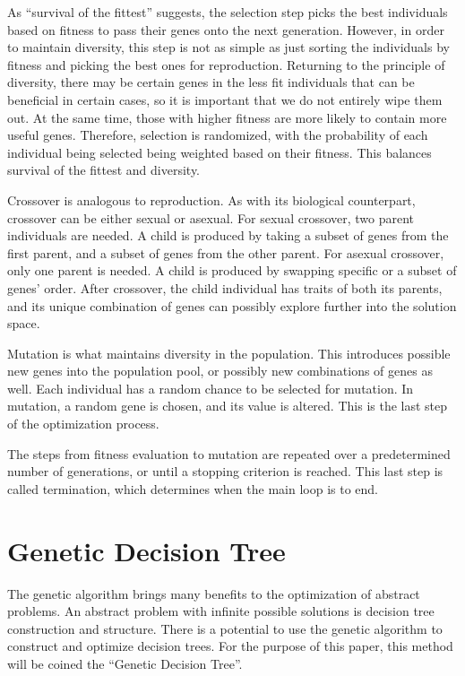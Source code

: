 \documentclass[12pt]{article}
\begin{document}
As ``survival of the fittest'' suggests, the selection step picks the best individuals based on fitness to pass their genes onto the next generation. However, in order to maintain diversity, this step is not as simple as just sorting the individuals by fitness and picking the best ones for reproduction. Returning to the principle of diversity, there may be certain genes in the less fit individuals that can be beneficial in certain cases, so it is important that we do not entirely wipe them out. At the same time, those with higher fitness are more likely to contain more useful genes. Therefore, selection is randomized, with the probability of each individual being selected being weighted based on their fitness. This balances survival of the fittest and diversity.

Crossover is analogous to reproduction. As with its biological counterpart, crossover can be either sexual or asexual. For sexual crossover, two parent individuals are needed. A child is produced by taking a subset of genes from the first parent, and a subset of genes from the other parent. For asexual crossover, only one parent is needed. A child is produced by swapping specific or a subset of genes' order. After crossover, the child individual has traits of both its parents, and its unique combination of genes can possibly explore further into the solution space.

Mutation is what maintains diversity in the population. This introduces possible new genes into the population pool, or possibly new combinations of genes as well. Each individual has a random chance to be selected for mutation. In mutation, a random gene is chosen, and its value is altered. This is the last step of the optimization process.

The steps from fitness evaluation to mutation are repeated over a predetermined number of generations, or until a stopping criterion is reached. This last step is called termination, which determines when the main loop is to end.

\section{Genetic Decision Tree}

The genetic algorithm brings many benefits to the optimization of abstract problems. An abstract problem with infinite possible solutions is decision tree construction and structure. There is a potential to use the genetic algorithm to construct and optimize decision trees. For the purpose of this paper, this method will be coined the ``Genetic Decision Tree''.
\end{document}
